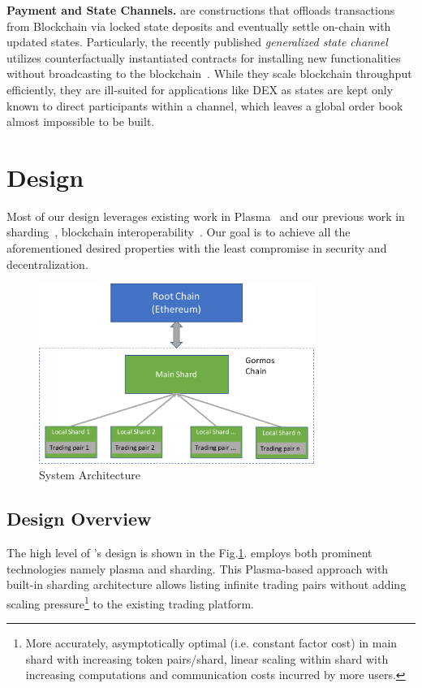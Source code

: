 \textbf{Payment and State Channels.}\cite{lightning, miller2017sprites} are constructions that offloads transactions from Blockchain via locked state deposits and eventually settle on-chain with updated states. Particularly, the recently published \textit{generalized state channel} utilizes counterfactually instantiated contracts for installing new functionalities without broadcasting to the blockchain~\cite{Coleman2018, Dziembowski2018}. While they scale blockchain throughput efficiently, they are ill-suited for applications like DEX as states are kept only known to direct participants within a channel, which leaves a global order book almost impossible to be built.

\section{Design}

Most of our design leverages existing work in Plasma~\cite{plasma} and our previous work in sharding~\cite{elastico}, blockchain interoperability~\cite{peacerelay}. Our goal is to achieve all the aforementioned desired properties with the least compromise in security and decentralization.

\begin{figure}[t]
  \centering
  \includegraphics[width=0.8\textwidth]{images//architecture}
  \caption{\codename System Architecture}
  \label{architecture}
\end{figure}


\subsection{Design Overview}
The high level of \codename's design is shown in the Fig.\ref{architecture}. \codename employs both prominent technologies namely plasma and sharding. This Plasma-based approach with built-in sharding architecture allows listing infinite trading pairs without adding scaling pressure\footnote{More accurately, asymptotically optimal (i.e. constant factor cost) in main shard with increasing token pairs/shard, linear scaling within shard with increasing computations and communication costs incurred by more users.} to the existing trading platform.

